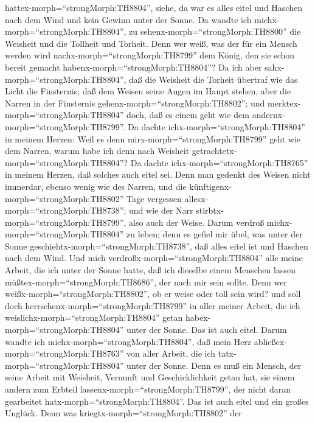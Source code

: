 hattex-morph=``strongMorph:TH8804'', siehe, da war es alles eitel und
Haschen nach dem Wind und kein Gewinn unter der Sonne.  Da
wandte ich michx-morph=``strongMorph:TH8804'', zu
sehenx-morph=``strongMorph:TH8800'' die Weisheit und die Tollheit und
Torheit. Denn wer weiß, was der für ein Mensch werden wird
nachx-morph=``strongMorph:TH8799'' dem König, den sie schon bereit
gemacht habenx-morph=``strongMorph:TH8804''?  Da ich aber
sahx-morph=``strongMorph:TH8804'', daß die Weisheit die Torheit übertraf
wie das Licht die Finsternis;  daß dem Weisen seine Augen
im Haupt stehen, aber die Narren in der Finsternis
gehenx-morph=``strongMorph:TH8802''; und
merktex-morph=``strongMorph:TH8804'' doch, daß es einem geht wie dem
andernx-morph=``strongMorph:TH8799''.  Da dachte
ichx-morph=``strongMorph:TH8804'' in meinem Herzen: Weil es denn
mirx-morph=``strongMorph:TH8799'' geht wie dem Narren, warum habe ich
denn nach Weisheit getrachtetx-morph=``strongMorph:TH8804''? Da dachte
ichx-morph=``strongMorph:TH8765'' in meinem Herzen, daß solches auch
eitel sei.  Denn man gedenkt des Weisen nicht immerdar,
ebenso wenig wie des Narren, und die
künftigenx-morph=``strongMorph:TH8802'' Tage vergessen
allesx-morph=``strongMorph:TH8738''; und wie der Narr
stirbtx-morph=``strongMorph:TH8799'', also auch der Weise. 
Darum verdroß michx-morph=``strongMorph:TH8804'' zu leben; denn es
gefiel mir übel, was unter der Sonne
geschiehtx-morph=``strongMorph:TH8738'', daß alles eitel ist und Haschen
nach dem Wind.  Und mich
verdroßx-morph=``strongMorph:TH8804'' alle meine Arbeit, die ich unter
der Sonne hatte, daß ich dieselbe einem Menschen lassen
müßtex-morph=``strongMorph:TH8686'', der nach mir sein sollte.
 Denn wer weißx-morph=``strongMorph:TH8802'', ob er weise
oder toll sein wird? und soll doch
herrschenx-morph=``strongMorph:TH8799'' in aller meiner Arbeit, die ich
weislichx-morph=``strongMorph:TH8804'' getan
habex-morph=``strongMorph:TH8804'' unter der Sonne. Das ist auch eitel.
 Darum wandte ich michx-morph=``strongMorph:TH8804'', daß
mein Herz abließex-morph=``strongMorph:TH8763'' von aller Arbeit, die
ich tatx-morph=``strongMorph:TH8804'' unter der Sonne. 
Denn es muß ein Mensch, der seine Arbeit mit Weisheit, Vernunft und
Geschicklichkeit getan hat, sie einem andern zum Erbteil
lassenx-morph=``strongMorph:TH8799'', der nicht daran gearbeitet
hatx-morph=``strongMorph:TH8804''. Das ist auch eitel und ein großes
Unglück.  Denn was kriegtx-morph=``strongMorph:TH8802'' der
